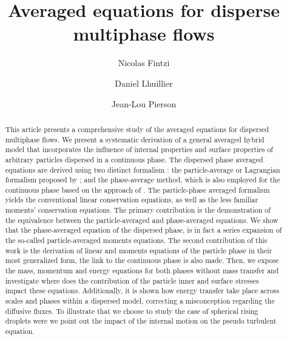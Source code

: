 \documentclass[11pt]{My_preprint}
\title{Averaged equations for disperse multiphase flows}
\author[1,2]{Nicolas Fintzi}
\author[2]{Daniel Lhuillier}
\author[1]{Jean-Lou Pierson}
\affil[1]{IFP Energies Nouvelles, Rond-point de l’changeur de Solaize, 69360 Solaize}
\affil[2]{Sorbonne Université, Institut Jean le Rond $\partial$’Alembert, 4 place Jussieu, 75252 PARIS CEDEX 05, France}
\begin{document}
\maketitle

\begin{abstract}
    This article presents a comprehensive study of the averaged equations for dispersed multiphase flows.
    We present a systematic derivation of a general averaged hybrid model that incorporates the influence of internal properties and surface properties of arbitrary particles dispersed in a continuous phase.
    The dispersed phase averaged equations are derived using two distinct formalism :
    the particle-average or Lagrangian formalism proposed by \citet{zhang1994ensemble,jackson1997locally};
    and the phase-average method, which is also employed for the continuous phase based on the approach of \citet{drew1983mathematical}. 
    The particle-phase averaged formalism yields the conventional linear conservation equations, as well as the less familiar moments' conservation equations.
    The primary contribution is the demonstration of the equivalence between the particle-averaged and phase-averaged equations. 
    We show that the phase-averaged equation of the dispersed phase, is in fact a series expansion of the so-called particle-averaged moments equations. 
    The second contribution of this work is the derivation of linear and moments equations of the particle phase in their most generalized form, the link to the continuous phase is also made. 
    Then, we expose the mass, momentum and energy equations for both phases without mass transfer and investigate where does the contribution of the particle inner and surface stresses impact these equations. 
    Additionally, it is shown how energy transfer take place across scales and phases within a dispersed model, correcting a misconception regarding the diffusive fluxes. 
    To illustrate that we choose to study the case of spherical rising droplets were we point out the impact of the internal motion on the pseudo turbulent equation. 

\end{abstract}
\end{document}
